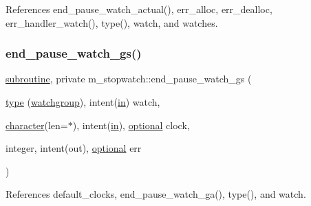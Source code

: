 References end\+\_\+pause\+\_\+watch\+\_\+actual(), err\+\_\+alloc, err\+\_\+dealloc, err\+\_\+handler\+\_\+watch(), type(), watch, and watches.

\mbox{\label{namespacem__stopwatch_a73243081be89522031b0767e9141663a}} 
\subsubsection{\texorpdfstring{end\+\_\+pause\+\_\+watch\+\_\+gs()}{end\_pause\_watch\_gs()}}
{\footnotesize\ttfamily \hyperlink{M__stopwatch_83_8txt_acfbcff50169d691ff02d4a123ed70482}{subroutine}, private m\+\_\+stopwatch\+::end\+\_\+pause\+\_\+watch\+\_\+gs (\begin{DoxyParamCaption}\item[{\hyperlink{stop__watch_83_8txt_a70f0ead91c32e25323c03265aa302c1c}{type} (\hyperlink{structm__stopwatch_1_1watchgroup}{watchgroup}), intent(\hyperlink{M__journal_83_8txt_afce72651d1eed785a2132bee863b2f38}{in})}]{watch,  }\item[{\hyperlink{option__stopwatch_83_8txt_abd4b21fbbd175834027b5224bfe97e66}{character}(len=$\ast$), intent(\hyperlink{M__journal_83_8txt_afce72651d1eed785a2132bee863b2f38}{in}), \hyperlink{option__stopwatch_83_8txt_aa4ece75e7acf58a4843f70fe18c3ade5}{optional}}]{clock,  }\item[{integer, intent(out), \hyperlink{option__stopwatch_83_8txt_aa4ece75e7acf58a4843f70fe18c3ade5}{optional}}]{err }\end{DoxyParamCaption})\hspace{0.3cm}{\ttfamily [private]}}



References default\+\_\+clocks, end\+\_\+pause\+\_\+watch\+\_\+ga(), type(), and watch.

\mbox{\label{namespacem__stopwatch_a4e478402d1066b90c1807d5fddb7e803}} 
